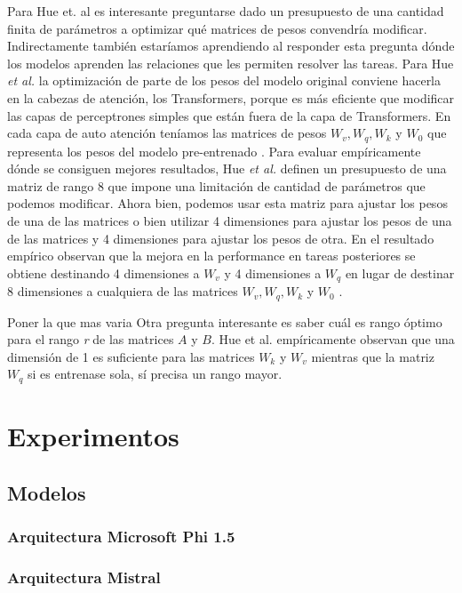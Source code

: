 \documentclass{book}
\begin{document}
Para Hue et. al es interesante preguntarse dado un presupuesto de una cantidad finita de parámetros a optimizar qué matrices de pesos convendría modificar. Indirectamente también estaríamos aprendiendo al responder esta pregunta dónde los modelos aprenden las relaciones que les permiten resolver las tareas. Para Hue \textit{et al.} la optimización de parte de los pesos del modelo original conviene hacerla en la cabezas de atención, los Transformers, porque es más eficiente que modificar las capas de perceptrones simples que están fuera de la capa de Transformers. En cada capa de auto atención teníamos las matrices de pesos $W_v, W_q, W_k$  y $W_0$ que representa los pesos del modelo pre-entrenado . Para evaluar empíricamente dónde se consiguen mejores resultados, Hue \textit{et al.} definen un presupuesto de una matriz de rango 8 que impone una limitación de cantidad de parámetros que podemos modificar. Ahora bien, podemos usar esta matriz para ajustar los pesos de una de las matrices o bien utilizar 4 dimensiones para ajustar los pesos de una de las matrices y 4 dimensiones para ajustar los pesos de otra. En el resultado empírico observan que la mejora en la performance en tareas posteriores se obtiene destinando 4 dimensiones a $W_v$ y 4 dimensiones a $W_q$ en lugar de destinar 8 dimensiones a cualquiera de las matrices  $W_v, W_q, W_k$  y $W_0$ . 

Poner la que mas varia
Otra pregunta interesante es saber cuál es rango óptimo para el rango \textit{r} de las matrices $A$ y $B$. Hue {et  al.} empíricamente observan que una dimensión de 1 es suficiente para las matrices $W_k$ y $W_v$ mientras que la matriz $W_q$ si es entrenase sola, sí precisa un rango mayor. 

\chapter{Experimentos}

\section{Modelos}
\subsection{Arquitectura Microsoft Phi 1.5}
\subsection{Arquitectura Mistral}
\end{document}
